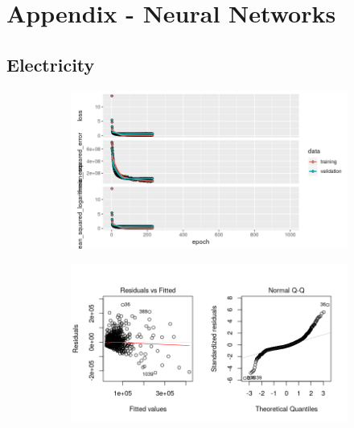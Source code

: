 \section*{Appendix - Neural Networks}
\label{sec:appendix_nn}
\appendix
\subsection{Electricity}
\label{appendix:electricity:nn_full}
\begin{figure}[h]
\begin{subfigure}{1\textwidth}
\centering
\includegraphics[width=.99\textwidth, height=0.3\textheight]{Images/electricity_nn_full_train_results.png}
\end{subfigure}
\begin{subfigure}{1\textwidth}
\centering
\includegraphics[width=.99\textwidth, height=0.3\textheight]{Images/electricity_nn_full_resid_1.png}
\end{subfigure}
\end{figure}